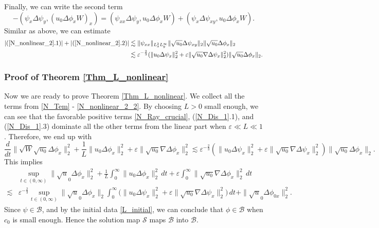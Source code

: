 \documentclass[reqno, 11pt]{amsart}
\theoremstyle{plain}
\theoremstyle{definition}
\theoremstyle{remark}
\numberwithin{equation}{section}
\newcommand\cB{\mathcal{B}}
\newcommand\cS{\mathcal{S}}
\begin{document}
Finally, we can write the second term
\begin{equation}\label{N_nonlinear_2}
-(\psi_x \Delta \psi_y, (u_0 \Delta\phi_x W)_x) =  (\psi_{xx} \Delta \psi_y, u_0 \Delta\phi_x W) + (\psi_{x} \Delta \psi_{xy}, u_0 \Delta\phi_x W).
\end{equation}
Similar as above, we can estimate
\begin{equation}\label{N_nonlinear_2_2}
\begin{aligned}
|(\ref{N_nonlinear_2}.1)| + |(\ref{N_nonlinear_2}.2)| &\lesssim \| \psi_{xx}\|_{L^2_x L^\infty_y} \| \sqrt{u_0} \Delta \psi_{xy} \|_{2} \| \sqrt{u_0} \Delta \phi_x\|_2\\
&\lesssim \varepsilon^{-\frac{2}{3}} (\|u_0 \Delta \psi_x\|_2^2  +  \varepsilon \| \sqrt{u_0} \nabla \Delta \psi_{x} \|_2^2) \| \sqrt{u_0} \Delta \phi_x\|_2.
\end{aligned}
\end{equation}

\subsubsection{Proof of Theorem \ref{Thm_L_nonlinear}}
Now we are ready to prove Theorem \ref{Thm_L_nonlinear}. We collect all the terms from \eqref{N_Tem} - \eqref{N_nonlinear_2_2}. By choosing $L > 0$ small enough, we can see that the favorable positive terms \eqref{N_Ray_crucial}, (\ref{N_Dis_1}.1), and (\ref{N_Dis_1}.3) dominate all the other terms from the linear part when $\varepsilon \ll L \ll 1$. Therefore, we end up with
\begin{equation}\label{est:L_nonlinear_final}
\frac{d}{dt} \|\sqrt{W} \sqrt{u_0} \Delta \phi_x \|_2^2 + \frac{1}{L} \|u_0 \Delta \phi_x\|_2^2 + \varepsilon \| \sqrt{u_0} \nabla \Delta \phi_x \|_2^2 \lesssim \varepsilon^{-\frac{2}{3}} (\|u_0 \Delta \psi_x\|_2^2  +  \varepsilon \| \sqrt{u_0} \nabla \Delta \psi_{x} \|_2^2) \| \sqrt{u_0} \Delta \phi_x\|_2.
\end{equation}
This implies
\begin{align*}
&\sup_{t \in (0,\infty)} \|\sqrt u_0 \Delta \phi_x\|_{2}^2 + \frac{1}{L} \int_0^\infty \| u_0 \Delta \phi_x \|_{2}^2 \, dt + \varepsilon \int_0^\infty  \| \sqrt{u_0} \nabla \Delta \phi_x \|_{2}^2 \, dt\\
\lesssim & \varepsilon^{-\frac{2}{3}} \sup_{t \in (0,\infty)} \|\sqrt u_0 \Delta \phi_x\|_{2} \int_0^\infty \Big( \|u_0 \Delta \psi_x\|_2^2  +  \varepsilon \| \sqrt{u_0} \nabla \Delta \psi_{x} \|_2^2 \Big) \, dt + \|\sqrt u_0 \Delta \phi_{0x}\|_{2}^2.
\end{align*}
Since $\psi \in \cB$, and by the initial data \eqref{L_initial}, we can conclude that $\phi \in \cB$ when $c_0$ is small enough. Hence the solution map $\cS$ maps $\cB$ into $\cB$. 
\end{document}
